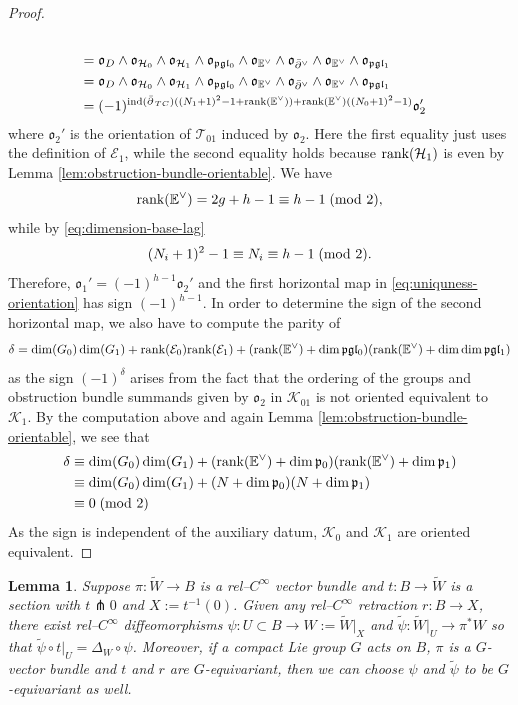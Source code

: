 \documentclass[11pt,psamsfonts, oneside, reqno]{amsart}
\newcommand{\sub}{\subset}%
\newcommand{\g}{\circ}%
\newcommand{\inv}{^{-1}}
\newcommand{\cl}{\colon}
\newcommand{\pf}{\pitchfork}
\newcommand{\dul}{^\vee}
\newcommand{\delbar}{\bar\partial}
\newcommand{\bE}{\mathbb{E}}
\newcommand{\cE}{\mathcal{E}}
\newcommand{\cH}{\mathcal{H}}
\newcommand{\cK}{\mathcal{K}}
\newcommand{\cT}{\mathcal{T}}
\newcommand{\fg}{\mathfrak{g}}
\newcommand{\fl}{\mathfrak{l}}
\newcommand{\fo}{\mathfrak{o}}
\newcommand{\fp}{\mathfrak{p}}
\newcommand{\rank}{\normalfont\text{rank}}
\newcommand{\wt}{\widetilde}
\newcommand{\ind}{\normalfont\text{ind}}
\newcommand{\hodge}{\bE\dul}
\newtheorem{lemma}[theorem]{Lemma}
\theoremstyle{definition}
\theoremstyle{remark}
\numberwithin{equation}{section}
\begin{document}
\begin{proof}
\begin{align*}
		\\& = \fo_D \wedge \fo_{\cH_0}\wedge \fo_{\cH_1} \wedge \fo_{\fp\fg\fl_0}\wedge \fo_{\hodge}\wedge \fo_{\delbar\dul}\wedge \fo_{\hodge}\wedge \fo_{\fp\fg\fl_1}
		\\& = \fo_D \wedge \fo_{\cH_0}\wedge \fo_{\cH_1} \wedge \fo_{\fp\fg\fl_0}\wedge \fo_{\hodge}\wedge \fo_{\delbar\dul}\wedge \fo_{\hodge}\wedge \fo_{\fp\fg\fl_1}
		\\&= (-1)^{\ind(\delbar_{\,TC})((N_1+1)^2-1 + \rank(\hodge))+\rank(\hodge)((N_0+1)^2-1)}\fo_2'
	\end{align*}
	where $\fo_2'$ is the orientation of $\cT_{01}$ induced by $\fo_2$. Here the first equality just uses the definition of $\cE_1$, while the second equality holds because $\rank(\cH_1)$ is even by Lemma \ref{lem:obstruction-bundle-orientable}. We have $$\rank(\hodge) = 2g+h-1\equiv h-1\;(\normalfont\text{mod } 2),$$ while by \eqref{eq:dimension-base-lag}
	$$(N_i+1)^2 -1 \equiv N_i \equiv h-1\;(\normalfont\text{mod } 2).$$ 
	Therefore, $\fo_1' = (-1)^{h-1} \fo_2'$ and the first horizontal map in \eqref{eq:uniquness-orientation} has sign $(-1)^{h-1} $. In order to determine the sign of the second horizontal map, we also have to compute the parity of 
	$$\delta = \dim(G_0)\dim(G_1)+ \rank(\cE_0)\rank(\cE_1) + (\rank(\hodge)+\dim\fp\fg\fl_0) (\rank(\hodge)+\dim\dim\fp\fg\fl_1)$$
	as the sign $(-1)^{\delta}$ arises from the fact that the ordering of the groups and obstruction bundle summands given by $\fo_2$ in $\cK_{01}$ is not oriented equivalent to $\cK_1$. By the computation above and again Lemma \ref{lem:obstruction-bundle-orientable}, we see that 
	\begin{align*}\delta &\equiv \dim(G_0)\dim(G_1)+ (\rank(\hodge)+\dim\fp_0)(\rank(\hodge)+\dim\fp_1) \\&\equiv  \dim(G_0)\dim(G_1)+ (N+\dim\fp_0)(N+\dim\fp_1)\\&\equiv 0\; (\normalfont\text{mod }2) \end{align*}
	As the sign is independent of the auxiliary datum, $\cK_0$ and $\cK_1$ are oriented equivalent.
\end{proof}

\begin{lemma}\label{lem:tubular-neighbourhood-for-stabilisation-1} Suppose $\pi \cl \wt W\to B$ is a rel--$C^\infty$ vector bundle and $t \cl B\to \wt W$ is a section with $t \pf 0$ and $X := t\inv(0)$. Given any rel--$C^\infty$ retraction $r \cl B\to X$, there exist rel--$C^\infty$ diffeomorphisms $\psi \cl U\sub B\to W := \wt W|_X$ and $\wt\psi \cl \wt W|_U \to \pi^*W$ so that $\wt\psi \g t|_U = \Delta_W\g \psi$. Moreover, if a compact Lie group $G$ acts on $B$, $\pi$ is a $G$-vector bundle and $t$ and $r$ are $G$-equivariant, then we can choose $\psi$ and $\wt\psi$ to be $G$-equivariant as well. 
\end{lemma}
\end{document}
